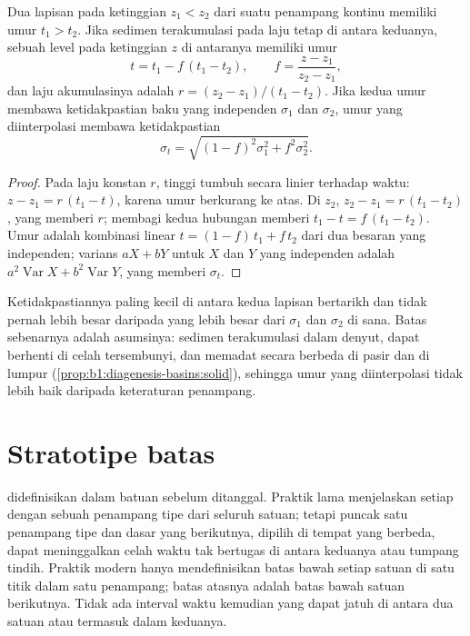 \begin{proposition}\label{prop:b1:stratigraphic-scale:interpolation}
Dua lapisan pada ketinggian $z_1 < z_2$ dari suatu penampang kontinu memiliki umur $t_1 > t_2$. Jika sedimen terakumulasi pada laju tetap di antara keduanya, sebuah level pada ketinggian $z$ di antaranya memiliki umur
\[
  t = t_1 - f\,(t_1 - t_2), \qquad f = \frac{z - z_1}{z_2 - z_1},
\]
dan laju akumulasinya adalah $r = (z_2 - z_1)/(t_1 - t_2)$. Jika kedua umur membawa ketidakpastian baku yang independen $\sigma_1$ dan $\sigma_2$, umur yang diinterpolasi membawa ketidakpastian
\[
  \sigma_t = \sqrt{(1 - f)^2 \sigma_1^2 + f^2 \sigma_2^2}.
\]
\end{proposition}

\begin{proof}
Pada laju konstan $r$, tinggi tumbuh secara linier terhadap waktu: $z - z_1 = r\,(t_1
- t)$, karena umur berkurang ke atas. Di $z_2$, $z_2 - z_1 = r\,(t_1 - t_2)$, yang memberi $r$; membagi kedua hubungan memberi $t_1 - t = f\,(t_1 - t_2)$. Umur adalah kombinasi linear $t = (1 - f)\,t_1 + f\,t_2$ dari dua besaran yang independen; varians $a X + b Y$ untuk $X$ dan $Y$ yang independen adalah $a^2
\operatorname{Var} X + b^2 \operatorname{Var} Y$, yang memberi $\sigma_t$.
\end{proof}

Ketidakpastiannya paling kecil di antara kedua lapisan bertarikh dan tidak pernah lebih besar daripada yang lebih besar dari $\sigma_1$ dan $\sigma_2$ di sana. Batas sebenarnya adalah asumsinya: sedimen terakumulasi dalam denyut, dapat berhenti di celah tersembunyi, dan memadat secara berbeda di pasir dan di lumpur (\cref{prop:b1:diagenesis-basins:solid}), sehingga umur yang diinterpolasi tidak lebih baik daripada keteraturan penampang.

\section{Stratotipe batas}\label{sec:b1:stratigraphic-scale:gssp}

 didefinisikan dalam batuan sebelum ditanggal. Praktik lama menjelaskan setiap  dengan sebuah penampang tipe dari seluruh satuan; tetapi puncak satu penampang tipe dan dasar yang berikutnya, dipilih di tempat yang berbeda, dapat meninggalkan celah waktu tak bertugas di antara keduanya atau tumpang tindih. Praktik modern hanya mendefinisikan batas bawah setiap satuan di satu titik dalam satu penampang; batas atasnya adalah batas bawah satuan berikutnya. Tidak ada interval waktu kemudian yang dapat jatuh di antara dua satuan atau termasuk dalam keduanya.

